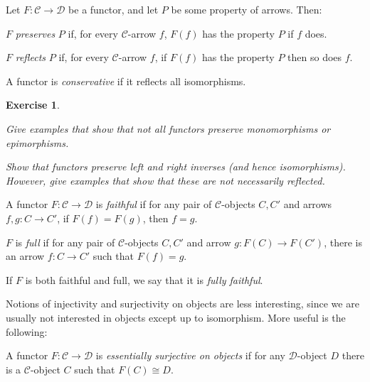 \documentclass[article, a4paper, 11pt, oneside]{memoir}
\numberwithin{equation}{chapter}
\newcommand{\cat}[1]{\mathcal{#1}}
\newcommand{\catC}{\cat{C}}
\newcommand{\catD}{\cat{D}}
\theoremstyle{myexample}
\theoremstyle{myexamplebreak}
\newtheorem{exercisebreak}[theorem]{Exercise}
\begin{document}
\begin{definition}
    Let $F \colon \catC \to \catD$ be a functor, and let $P$ be some property of arrows. Then:
    \begin{enumdef}
        \item $F$ \emph{preserves} $P$ if, for every $\catC$-arrow $f$, $F(f)$ has the property $P$ if $f$ does.

        \item $F$ \emph{reflects} $P$ if, for every $\catC$-arrow $f$, if $F(f)$ has the property $P$ then so does $f$.
    \end{enumdef}
    A functor is \emph{conservative} if it reflects all isomorphisms.
\end{definition}

\begin{exercisebreak}
    \begin{enumexercise}
        \item Give examples that show that not all functors preserve monomorphisms or epimorphisms.

        \item Show that functors preserve left and right inverses (and hence isomorphisms). However, give examples that show that these are not necessarily reflected.
    \end{enumexercise}
\end{exercisebreak}


\begin{definition}
    A functor $F \colon \catC \to \catD$ is \emph{faithful} if for any pair of $\catC$-objects $C, C'$ and arrows $f,g \colon C \to C'$, if $F(f) = F(g)$, then $f = g$.

    $F$ is \emph{full} if for any pair of $\catC$-objects $C,C'$ and arrow $g \colon F(C) \to F(C')$, there is an arrow $f \colon C \to C'$ such that $F(f) = g$.

    If $F$ is both faithful and full, we say that it is \emph{fully faithful}.
\end{definition}
%
Notions of injectivity and surjectivity on objects are less interesting, since we are usually not interested in objects except up to isomorphism. More useful is the following:

\begin{definition}
    A functor $F \colon \catC \to \catD$ is \emph{essentially surjective on objects} if for any $\catD$-object $D$ there is a $\catC$-object $C$ such that $F(C) \cong D$.
\end{definition}
\end{document}
